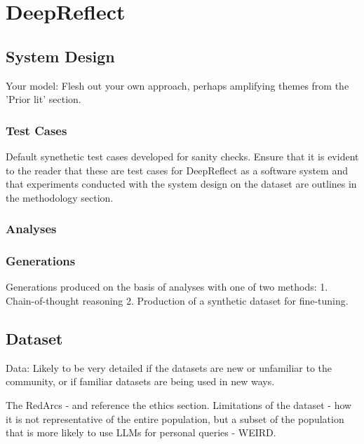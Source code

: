 
\section{DeepReflect}

\subsection{System Design}\label{sec:deepreflect}
\textcolor{black!40}{Your model: Flesh out your own approach, perhaps amplifying themes from the 'Prior lit' section.}

\subsubsection{Test Cases}
\textcolor{black!40}{Default synethetic test cases developed for sanity checks.}
\textcolor{black!40}{Ensure that it is evident to the reader that these are test cases for DeepReflect as a software system and that experiments conducted with the system design on the dataset are outlines in the methodology section.}
\textcolor{black!30}{\lipsum[9-10]}

\subsubsection{Analyses}
\textcolor{black!30}{\lipsum[8-9]}

\subsubsection{Generations}
\textcolor{black!40}{Generations produced on the basis of analyses with one of two methods: 1. Chain-of-thought reasoning 2. Production of a synthetic dataset for fine-tuning.}
\textcolor{black!30}{\lipsum[9-10]}

\subsection{Dataset}
\textcolor{black!30}{Data: Likely to be very detailed if the datasets are new or unfamiliar to the community, or if familiar datasets are being used in new ways.}

\textcolor{black!30}{The RedArcs - and reference the ethics section. Limitations of the dataset - how it is not representative of the entire population, but a subset of the population that is more likely to use LLMs for personal queries - WEIRD.}
